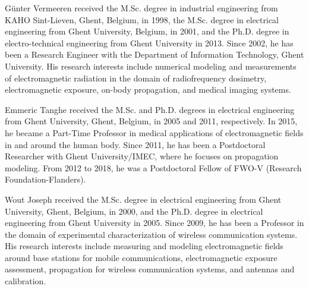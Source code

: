 \documentclass{ieeeaccess}
\begin{document}
\begin{IEEEbiographynophoto}{G\"unter Vermeeren}
received the M.Sc. degree in industrial engineering from KAHO Sint-Lieven,
Ghent, Belgium, in 1998, the M.Sc. degree in electrical engineering from Ghent
University, Belgium, in 2001, and the Ph.D. degree in electro-technical
engineering from Ghent University in 2013. Since 2002, he has been a Research
Engineer with the Department of Information Technology, Ghent University. His
research interests include numerical modeling and measurements of
electromagnetic radiation in the domain of radiofrequency dosimetry,
electromagnetic exposure, on-body propagation, and medical imaging systems.
\end{IEEEbiographynophoto}

\begin{IEEEbiographynophoto}{Emmeric Tanghe}
received the M.Sc. and Ph.D. degrees in electrical engineering from Ghent
University, Ghent, Belgium, in 2005 and 2011, respectively. In 2015, he became
a Part-Time Professor in medical applications of electromagnetic fields in and
around the human body. Since 2011, he has been a Postdoctoral Researcher with
Ghent University/IMEC, where he focuses on propagation modeling. From 2012 to
2018, he was a Postdoctoral Fellow of FWO-V (Research Foundation-Flanders).
\end{IEEEbiographynophoto}

\begin{IEEEbiographynophoto}{Wout Joseph}
received the M.Sc. degree in electrical engineering from Ghent University,
Ghent, Belgium, in 2000, and the Ph.D. degree in electrical engineering from
Ghent University in 2005. Since 2009, he has been a Professor in the domain of
experimental characterization of wireless communication systems. His research
interests include measuring and modeling electromagnetic fields around base
stations for mobile communications, electromagnetic exposure assessment,
propagation for wireless communication systems, and antennas and calibration.
\end{IEEEbiographynophoto}

\EOD
\end{document}
